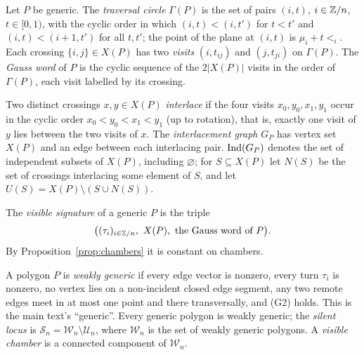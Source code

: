 \begin{definition}\label{def:gauss}
Let $P$ be generic. The \emph{traversal circle} $\Gamma(P)$ is the set of
pairs $(i,t)$, $i\in\mathbb Z/n$, $t\in[0,1)$, with the cyclic order in which
$(i,t)<(i,t')$ for $t<t'$ and $(i,t)<(i+1,t')$ for all $t,t'$; the point of
the plane at $(i,t)$ is $\mu_i+t\lt_i$. Each crossing $\{i,j\}\in X(P)$ has
two \emph{visits} $(i,t_{ij})$ and $(j,t_{ji})$ on $\Gamma(P)$. The
\emph{Gauss word} of $P$ is the cyclic sequence of the $2|X(P)|$ visits in
the order of $\Gamma(P)$, each visit labelled by its crossing.
\end{definition}

\begin{definition}[interlacement]\label{def:interlace}
Two distinct crossings $x,y\in X(P)$ \emph{interlace} if the four visits
$x_0,y_0,x_1,y_1$ occur in the cyclic order $x_0<y_0<x_1<y_1$ (up to rotation),
that is, exactly one visit of $y$ lies between the two visits of $x$. The
\emph{interlacement graph} $G_P$ has vertex set $X(P)$ and an edge between
each interlacing pair. $\operatorname{Ind}(G_P)$ denotes the set of independent subsets of
$X(P)$, including $\varnothing$; for $S\subseteq X(P)$ let $N(S)$ be the set of
crossings interlacing some element of $S$, and let
$U(S)=X(P)\setminus(S\cup N(S))$.
\end{definition}

\begin{definition}\label{def:visible}
The \emph{visible signature} of a generic $P$ is the triple
\[
\bigl((\tau_i)_{i\in\ZZ/n},\ X(P),\ \text{the Gauss word of }P\bigr).
\]
By Proposition~\ref{prop:chambers} it is constant on chambers.
\end{definition}


\begin{definition}\label{def:weak}
A polygon $P$ is \emph{weakly generic} if every edge vector is nonzero, every
turn $\tau_i$ is nonzero, no vertex lies on a non-incident closed edge
segment, any two remote edges meet in at most one point and there
transversally, and (G2) holds. This is the main text's ``generic''. Every
generic polygon is weakly generic; the \emph{silent locus} is
$\mathcal S_n=\mathcal W_n\setminus\mathcal U_n$, where $\mathcal W_n$ is the
set of weakly generic polygons. A \emph{visible chamber} is a connected
component of $\mathcal W_n$.
\end{definition}

